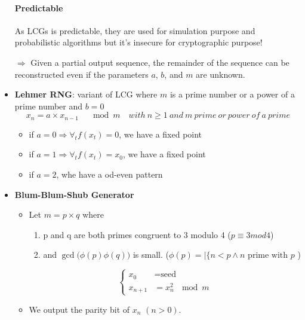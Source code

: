 \begin{itemize}
        \paragraph{Predictable}
        As LCGs is predictable, they are used for simulation purpose and probabilistic
        algorithms but it's insecure
        for cryptographic purpose!

        $\Rightarrow$ Given a partial output sequence, the remainder of
        the sequence can be reconstructed even if the parameters $a$, $b$,
        and $m$ are unknown.

    \item \textbf{Lehmer RNG}: variant of LCG where $m$ is a prime
        number or a power of a prime number and $b=0$
        $$ x_n = a\times x_{n-1}  \quad \mod{m}\quad with\ n \geq 1 \
        and\ m\ prime\ or\ power\ of\ a\ prime $$

        \begin{itemize}
            \item if $a=0 \Rightarrow \forall_t f(x_t)=0$, we have a fixed point
            \item if $a=1 \Rightarrow \forall_t f(x_t)=x_0$, we have a fixed point
                \item if $a=2$, whe have a od-even pattern
                    \end{itemize}

    \item \textbf{Blum-Blum-Shub Generator}
        \begin{itemize}
            \item Let $m=p\times q$ where 
                \begin{enumerate}
                        \item p and q are both primes congruent to 3 modulo
                4 ($p \equiv 3 mod 4$)
                        \item and $ \gcd{\big(\phi(p)}{\phi(q)\big)} $
                            is small. ($\phi(p) = |\{ n < p \wedge n
                                \textrm{ prime with } p$ )
                            \end{enumerate}
                $$\begin{cases}
                        x_0 & = \textrm{seed}\\
                        x_{n+1} & = x^2_n\ \mod{m}
                        \end{cases}$$
            \item We output the parity bit of $x_n$ $(n>0)$.
        \end{itemize}


\end{itemize}

